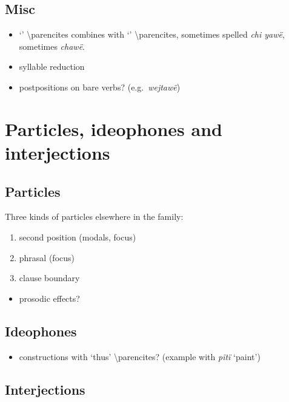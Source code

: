 \documentclass{memoir}
\begin{document}
\section{Misc}

\begin{itemize}
\tightlist
\item
   `' \textbackslash parencites combines with
   `' \textbackslash parencites, sometimes spelled
  \emph{chi yawë}, sometimes \emph{chawë}.
\item
  syllable reduction
\item
  postpositions on bare verbs? (e.g.~\emph{wejtawë})
\end{itemize}

\chapter{\texorpdfstring{Particles, ideophones and interjections
\label{partideo}}{Particles, ideophones and interjections }}

\section{Particles}

Three kinds of particles elsewhere in the family:

\begin{enumerate}
\def\labelenumi{\arabic{enumi}.}
\tightlist
\item
  second position (modals, focus)
\item
  phrasal (focus)
\item
  clause boundary
\end{enumerate}

\begin{itemize}
\tightlist
\item
  prosodic effects?
\end{itemize}

\section{Ideophones}

\begin{itemize}
\tightlist
\item
  constructions with  `thus' \textbackslash parencites?
  (example with \emph{pïtï} `paint')
\end{itemize}

\section{Interjections}
\end{document}
